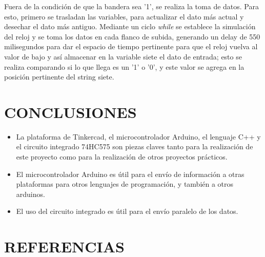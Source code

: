 \documentclass{article}
\begin{document}
Fuera de la condición de que la bandera sea '1', se realiza la toma de datos. Para esto, primero se trasladan las variables, para actualizar el dato más actual y desechar el dato más antiguo. Mediante un ciclo \textit{while} se establece la simulación del reloj y se toma los datos en cada flanco de subida, generando un delay de 550 milisegundos para dar el espacio de tiempo pertinente para que el reloj vuelva al valor de bajo y así almacenar en la variable siete el dato de entrada; esto se realiza comparando si lo que llega es un '1' o '0', y este valor se agrega en la posición pertinente del string siete.


\section{CONCLUSIONES} \label{conclulsion}
\begin{itemize}
\item La plataforma de Tinkercad, el microcontrolador Arduino, el lenguaje C++ y el circuito integrado 74HC575 son piezas claves tanto para la realización de este proyecto como para la realización de otros proyectos prácticos.
\item El microcontrolador Arduino es útil para el envío de información a otras plataformas para otros lenguajes de programación, y también a otros arduinos.
\item El uso del circuito integrado es útil para el envío paralelo de los datos.

\end{itemize}

\section{REFERENCIAS}    




\end{document}
